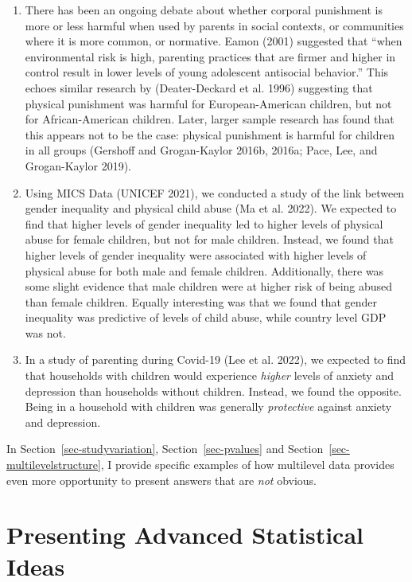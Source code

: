 \documentclass[
  letterpaper,
  DIV=11,
  numbers=noendperiod]{scrreprt}
\providecommand{\tightlist}{%
  \setlength{\itemsep}{0pt}\setlength{\parskip}{0pt}}\usepackage{longtable,booktabs,array}
\begin{document}
\begin{enumerate}
\def\labelenumi{\arabic{enumi}.}
\tightlist
\item
  There has been an ongoing debate about whether corporal punishment is
  more or less harmful when used by parents in social contexts, or
  communities where it is more common, or normative. Eamon (2001)
  suggested that ``when environmental risk is high, parenting practices
  that are firmer and higher in control result in lower levels of young
  adolescent antisocial behavior.'' This echoes similar research by
  (Deater-Deckard et al. 1996) suggesting that physical punishment was
  harmful for European-American children, but not for African-American
  children. Later, larger sample research has found that this appears
  not to be the case: physical punishment is harmful for children in all
  groups (Gershoff and Grogan-Kaylor 2016b, 2016a; Pace, Lee, and
  Grogan-Kaylor 2019).
\item
  Using MICS Data (UNICEF 2021), we conducted a study of the link
  between gender inequality and physical child abuse (Ma et al. 2022).
  We expected to find that higher levels of gender inequality led to
  higher levels of physical abuse for female children, but not for male
  children. Instead, we found that higher levels of gender inequality
  were associated with higher levels of physical abuse for both male and
  female children. Additionally, there was some slight evidence that
  male children were at higher risk of being abused than female
  children. Equally interesting was that we found that gender inequality
  was predictive of levels of child abuse, while country level GDP was
  not.
\item
  In a study of parenting during Covid-19 (Lee et al. 2022), we expected
  to find that households with children would experience \emph{higher}
  levels of anxiety and depression than households without children.
  Instead, we found the opposite. Being in a household with children was
  generally \emph{protective} against anxiety and depression.
\end{enumerate}

In Section~\ref{sec-studyvariation}, Section~\ref{sec-pvalues} and
Section~\ref{sec-multilevelstructure}, I provide specific examples of
how multilevel data provides even more opportunity to present answers
that are \emph{not} obvious.

\hypertarget{presenting-advanced-statistical-ideas}{%
\section{Presenting Advanced Statistical
Ideas}\label{presenting-advanced-statistical-ideas}}
\end{document}

